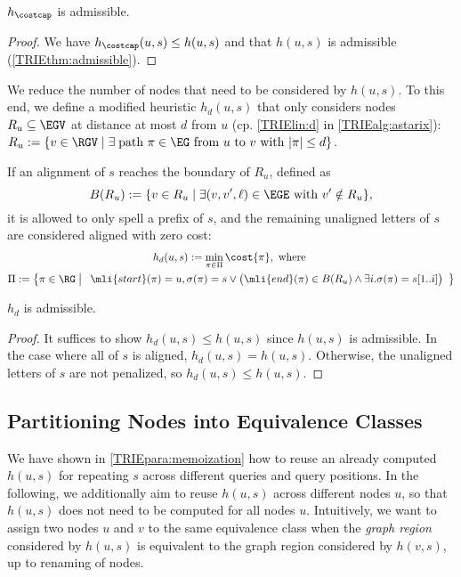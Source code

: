 \begin{samepage}
	\begin{thm} \label{TRIEthm:hbar_admissible}
		$h_{\costcap}$ is admissible.
	\end{thm}
	\begin{proof}
		We have $h_\costcap(u,s) \leq h(u,s)$ and that $h(u,s)$ is
		admissible (\cref{TRIEthm:admissible}).
	\end{proof}
	\end{samepage}

We reduce the number of nodes that need to be considered by $h(u,s)$. To this
end, we define a modified heuristic $h_d(u,s)$ that only considers nodes $R_u
\subseteq \EGV$ at distance at most $d$ from $u$ (cp. \cref{TRIElin:d} in
\cref{TRIEalg:astarix}):
$
R_u := \{ v \in \RGV \mid \exists \; \text{path } \pi \in \EG \text{ from } u \text{ to } v \text{ with } \lvert \pi \rvert \leq d \}
$.

If an alignment of $s$ reaches the boundary of $R_u$, defined as $$B(R_u) := \{v
\in R_u \mid \exists (v,v',\ell) \in \EGE \text{ with } v' \notin R_u \},$$ it is
allowed to only spell a prefix of $s$, and the remaining unaligned letters of
$s$ are considered aligned with zero cost:
\begin{gather*}
h_d(u,s) := \min_{\pi \in \Pi} \cost{\pi}, \text{ where } \\
\Pi := \left\{ \pi \in \RG \;\middle|\; \begin{array}{c}
\mli{start}(\pi)=u, 
\sigma(\pi)=s \lor \big(\mli{end}(\pi)\in B(R_u) \land \exists i. \sigma(\pi)=s[1..i] \big)
\end{array}
\right\}
\end{gather*}

\begin{samepage}
\begin{thm} \label{TRIEthm:hbar_admissible}
	$h_d$ is admissible.
\end{thm}
\begin{proof}
It suffices to show $h_d(u,s) \leq h(u, s)$ since $h(u, s)$ is admissible. In
the case where all of $s$ is aligned, $h_d(u,s) = h(u, s)$. Otherwise, the
unaligned letters of $s$ are not penalized, so $h_d(u,s) \leq h(u, s)$.
\end{proof}
\end{samepage}


\subsection{Partitioning Nodes into Equivalence Classes} \label{TRIEsubsec:partition}
We have shown in \cref{TRIEpara:memoization} how to reuse an already computed
$h(u,s)$ for repeating $s$ across different queries and query positions. In the
following, we additionally aim to reuse $h(u,s)$ across different nodes $u$, so
that $h(u,s)$ does not need to be computed for all nodes $u$. Intuitively, we
want to assign two nodes $u$ and $v$ to the same equivalence class when the
\emph{graph region} considered by $h(u,s)$ is equivalent to the graph region
considered by $h(v,s)$, up to renaming of nodes.

